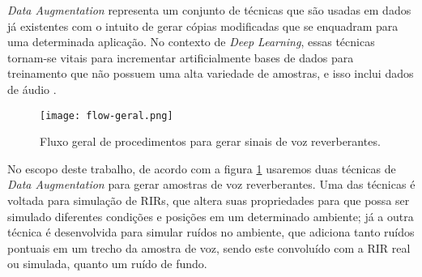 \textit{Data Augmentation} representa um conjunto de técnicas que são usadas em dados já existentes com o intuito de gerar cópias
modificadas que se enquadram para uma determinada aplicação. No contexto de \textit{Deep Learning}, essas técnicas tornam-se vitais
para incrementar artificialmente bases de dados para treinamento que não possuem uma alta variedade de amostras, e isso inclui 
dados de áudio \cite{DL_Data_Aug_sc,Metric_Data_Aug_sc}.

\begin{figure} [H]
    \centering
    \texttt{[image: flow-geral.png]}
    \caption{Fluxo geral de procedimentos para gerar sinais de voz reverberantes.}
    \label{fig:flow-geral}
\end{figure} 

No escopo deste trabalho, de acordo com a figura \ref{fig:flow-geral} usaremos duas técnicas de \textit{Data Augmentation} para gerar amostras
de voz reverberantes. Uma das técnicas é voltada para simulação de RIRs, que altera suas propriedades para que possa ser simulado diferentes condições
e posições em um determinado ambiente; já a outra técnica é desenvolvida para simular ruídos no ambiente, que adiciona tanto ruídos pontuais em um trecho
da amostra de voz, sendo este convoluído com a RIR real ou simulada, quanto um ruído de fundo. 
 
